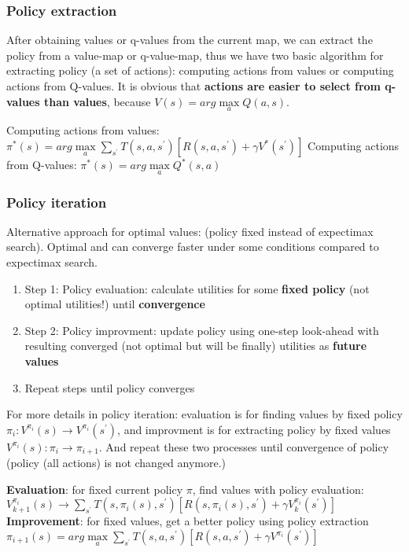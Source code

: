 \subsubsection{Policy extraction}
After obtaining values or q-values from the current map, we can extract the policy from a value-map or q-value-map, thus we have two basic algorithm for extracting policy (a set of actions): computing actions from values or computing actions from Q-values. It is obvious that \textbf{actions are easier to select from q-values than values}, because $V(s) = arg\max\limits_a Q(a,s)$.
\begin{outline}
    \1 Computing actions from values:
        \2 $\pi^{*}(s) = arg\max\limits_a \sum_{s^{\prime}} T(s,a,s^{\prime}) [R(s,a,s^{\prime}) + \gamma V^{*}(s^{\prime})]$
    \1 Computing actions from Q-values:
        \2 $\pi^{*}(s) = arg\max\limits_a Q^{*}(s,a)$
\end{outline}

\subsubsection{Policy iteration}
Alternative approach for optimal values: (policy fixed instead of expectimax search). Optimal and can converge faster under some conditions compared to expectimax search.
\begin{enumerate}
    \item Step 1: Policy evaluation: calculate utilities for some \textbf{fixed policy} (not optimal utilities!) until \textbf{convergence}
    \item Step 2: Policy improvment: update policy using one-step look-ahead with resulting converged (not optimal but will be finally) utilities as \textbf{future values}
    \item Repeat steps until policy converges
\end{enumerate}

\noindent
For more details in policy iteration: evaluation is for finding values by fixed policy $\pi_{i}: V^{\pi_{i}}(s) \rightarrow V^{\pi_{i}}(s^{\prime})$, and improvment is for extracting policy by fixed values $V^{\pi_{i}}(s): \pi_{i} \rightarrow \pi_{i+1}$. And repeat these two processes until convergence of policy (policy (all actions) is not changed anymore.)
\begin{outline}
    \1 \textbf{Evaluation}: for fixed current policy $\pi$, find values with policy evaluation:
        \2  $V_{k+1}^{\pi_{i}}(s) \rightarrow \sum_{s^{\prime}} T(s,\pi_{i}(s),s^{\prime}) [R(s,\pi_{i}(s),s^{\prime}) + \gamma V_{k}^{\pi_{i}}(s^{\prime})]$
    \1 \textbf{Improvement}: for fixed values, get a better policy using policy extraction
        \2 $\pi_{i+1}(s) = arg\max\limits_a \sum_{s^{\prime}} T(s,a,s^{\prime}) [R(s,a,s^{\prime}) + \gamma V^{\pi_{i}}(s^{\prime})]$
\end{outline}

